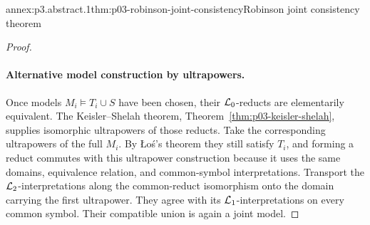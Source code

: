 \begin{annexitem}{annex:p3.abstract.1}{thm:p03-robinson-joint-consistency}{Robinson joint consistency theorem}
\begin{proof}
\paragraph{Alternative model construction by ultrapowers.}
Once models \(M_i\models T_i\cup S\) have been chosen, their
\(\mathcal{L}_0\)-reducts are elementarily equivalent.
The Keisler--Shelah theorem,
Theorem~\ref{thm:p03-keisler-shelah}, supplies isomorphic ultrapowers
of those reducts.  Take the corresponding ultrapowers of the full
\(M_i\).  By \L o\'s's theorem they still satisfy \(T_i\), and
forming a reduct commutes with this ultrapower construction because
it uses the same domains, equivalence relation, and common-symbol
interpretations.
Transport the \(\mathcal{L}_2\)-interpretations along the common-reduct
isomorphism onto the domain carrying the first ultrapower.
They agree with its \(\mathcal{L}_1\)-interpretations on every common
symbol.  Their compatible union is again a joint model.
\end{proof}
\end{annexitem}

